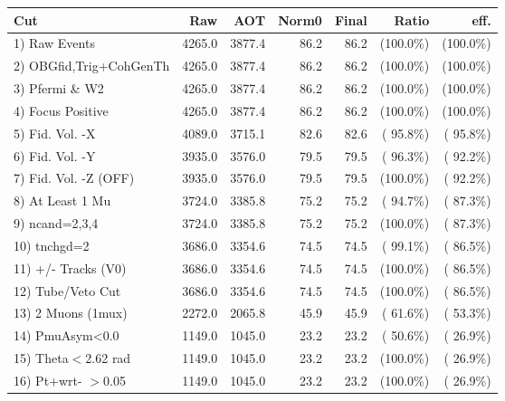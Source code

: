  \begin{table}[h!]\centering
 \begin{tabular}{||l||r|r|r|r|r|r||}
 \hline
 \hline
 Cut & Raw & AOT & Norm0 & Final & Ratio & eff.       \\
 \hline
  1) Raw Events           &       4265.0 &       3877.4 &         86.2 &         86.2 & (100.0\%) & (100.0\%) \\
  2) OBGfid,Trig+CohGenTh &       4265.0 &       3877.4 &         86.2 &         86.2 & (100.0\%) & (100.0\%) \\
  3) Pfermi \& W2         &       4265.0 &       3877.4 &         86.2 &         86.2 & (100.0\%) & (100.0\%) \\
  4) Focus Positive       &       4265.0 &       3877.4 &         86.2 &         86.2 & (100.0\%) & (100.0\%) \\
  5) Fid. Vol. -X         &       4089.0 &       3715.1 &         82.6 &         82.6 & ( 95.8\%) & ( 95.8\%) \\
  6) Fid. Vol. -Y         &       3935.0 &       3576.0 &         79.5 &         79.5 & ( 96.3\%) & ( 92.2\%) \\
  7) Fid. Vol. -Z (OFF)   &       3935.0 &       3576.0 &         79.5 &         79.5 & (100.0\%) & ( 92.2\%) \\
  8) At Least 1 Mu        &       3724.0 &       3385.8 &         75.2 &         75.2 & ( 94.7\%) & ( 87.3\%) \\
  9) ncand=2,3,4          &       3724.0 &       3385.8 &         75.2 &         75.2 & (100.0\%) & ( 87.3\%) \\
 10) tnchgd=2             &       3686.0 &       3354.6 &         74.5 &         74.5 & ( 99.1\%) & ( 86.5\%) \\
 11) +/- Tracks (V0)      &       3686.0 &       3354.6 &         74.5 &         74.5 & (100.0\%) & ( 86.5\%) \\
 12) Tube/Veto Cut        &       3686.0 &       3354.6 &         74.5 &         74.5 & (100.0\%) & ( 86.5\%) \\
 13) 2 Muons (1mux)       &       2272.0 &       2065.8 &         45.9 &         45.9 & ( 61.6\%) & ( 53.3\%) \\
 14) PmuAsym<0.0          &       1149.0 &       1045.0 &         23.2 &         23.2 & ( 50.6\%) & ( 26.9\%) \\
 15) Theta$<$2.62 rad     &       1149.0 &       1045.0 &         23.2 &         23.2 & (100.0\%) & ( 26.9\%) \\
 16) Pt+wrt- $>$0.05      &       1149.0 &       1045.0 &         23.2 &         23.2 & (100.0\%) & ( 26.9\%) \\

\end{tabular}
\end{table}
